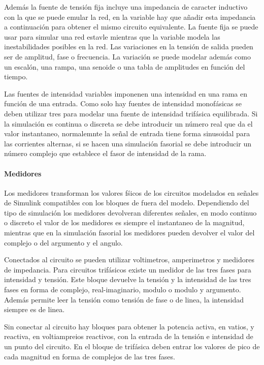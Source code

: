 \documentclass{book}
\begin{document}
Adem\'as la fuente de tensi\'on fija incluye una impedancia de caracter inductivo con la que se puede emular la red, en la variable hay que añadir esta impedancia a continuaci\'on para obtener el mismo circuito equivalente. La fuente fija se puede usar para simular una red estavle mientras que la variable modela las inestabilidades posibles en la red. Las variaciones en la tensi\'on de salida pueden ser de amplitud, fase o frecuencia. La variaci\'on se puede modelar adem\'as como un escal\'on, una rampa, una senoide o una tabla de amplitudes en funci\'on del tiempo. \par

Las fuentes de intensidad variables imponenen una intensidad en una rama en funci\'on de una entrada. Como solo hay fuentes de intensidad monof\'asicas se deben utilizar tres para modelar una fuente de intensidad trif\'asica equilibrada. Si la simulaci\'on es continua o discreta se debe introducir un n\'umero real que da el valor instantaneo, normalemnte la señal de entrada tiene forma sinusoidal para las corrientes alternas, si se hacen una simulaci\'on fasorial se debe introducir un n\'umero complejo que establece el fasor de intensidad de la rama. \par

		\paragraph {Medidores}
Los medidores transforman los valores f\'sicos de los circuitos modelados en señales de Simulink compatibles con los bloques de fuera del modelo. Dependiendo del tipo de simulaci\'on los medidores devolveran diferentes señales, en modo continuo o discreto el valor de los medidores es siempre el instantaneo de la magnitud, mientras que en la simulaci\'on fasorial los medidores pueden devolver el valor del complejo o del argumento y el angulo. \par

Conectados al circuito se pueden utilizar voltimetros, amperimetros y medidores de impedancia. Para circuitos trif\'asicos existe un medidor de las tres fases para intensidad y tensi\'on. Este bloque devuelve la tensi\'on y la intensidad de las tres fases en forma de complejo, real-imaginario, modulo o modulo y argumento. Adem\'as permite leer la tensi\'on como tensi\'on de fase o de linea, la intensidad siempre es de linea. \par

Sin conectar al circuito hay bloques para obtener la potencia activa, en vatios, y reactiva, en voltiampreios reactivos, con la entrada de la tensi\'on e intensidad de un punto del circuito. En el bloque de trif\'asica deben entrar los valores de pico de cada magnitud en forma de complejos de las tres fases. \par
 
\end{document}
